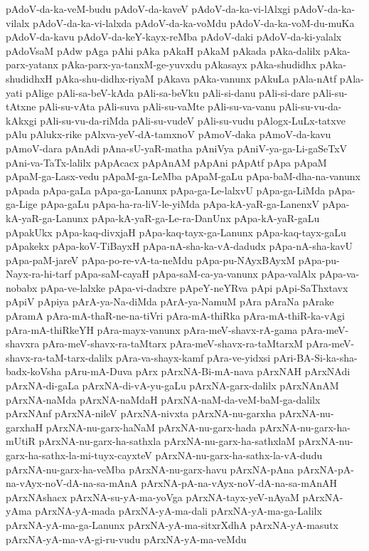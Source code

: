 {pAdoV-da-ka-veM-budu
pAdoV-da-kaveV
pAdoV-da-ka-vi-lAlxgi
pAdoV-da-ka-vilalx
pAdoV-da-ka-vi-lalxda
pAdoV-da-ka-voMdu
pAdoV-da-ka-voM-du-muKa
pAdoV-da-kavu
pAdoV-da-keY-kayx-reMba
pAdoV-daki
pAdoV-da-ki-yalalx
pAdoVsaM
pAdw
pAga
pAhi
pAka
pAkaH
pAkaM
pAkada
pAka-dalilx
pAka-parx-yatanx
pAka-parx-ya-tanxM-ge-yuvxdu
pAkasayx
pAka-shudidhx
pAka-shudidhxH
pAka-shu-didhx-riyaM
pAkava
pAka-vanunx
pAkuLa
pAla-nAtf
pAla-yati
pAlige
pAli-sa-beV-kAda
pAli-sa-beVku
pAli-si-danu
pAli-si-dare
pAli-su-tAtxne
pAli-su-vAta
pAli-suva
pAli-su-vaMte
pAli-su-va-vanu
pAli-su-vu-da-kAkxgi
pAli-su-vu-da-riMda
pAli-su-vudeV
pAli-su-vudu
pAlogx-LuLx-tatxve
pAlu
pAlukx-rike
pAlxva-yeV-dA-tamxnoV
pAmoV-daka
pAmoV-da-kavu
pAmoV-dara
pAnAdi
pAna-sU-yaR-matha
pAniVya
pAniV-ya-ga-Li-gaSeTxV
pAni-va-TaTx-lalilx
pApAcacx
pApAnAM
pApAni
pApAtf
pApa
pApaM
pApaM-ga-Lasx-vedu
pApaM-ga-LeMba
pApaM-gaLu
pApa-baM-dha-na-vanunx
pApada
pApa-gaLa
pApa-ga-Lanunx
pApa-ga-Le-lalxvU
pApa-ga-LiMda
pApa-ga-Lige
pApa-gaLu
pApa-ha-ra-liV-le-yiMda
pApa-kA-yaR-ga-LanenxV
pApa-kA-yaR-ga-Lanunx
pApa-kA-yaR-ga-Le-ra-DanUnx
pApa-kA-yaR-gaLu
pApakUkx
pApa-kaq-divxjaH
pApa-kaq-tayx-ga-Lanunx
pApa-kaq-tayx-gaLu
pApakekx
pApa-koV-TiBayxH
pApa-nA-sha-ka-vA-dadudx
pApa-nA-sha-kavU
pApa-paM-jareV
pApa-po-re-vA-ta-neMdu
pApa-pu-NAyxBAyxM
pApa-pu-Nayx-ra-hi-tarf
pApa-saM-cayaH
pApa-saM-ca-ya-vanunx
pApa-valAlx
pApa-va-nobabx
pApa-ve-lalxke
pApa-vi-dadxre
pApeY-neYRva
pApi
pApi-SaThxtavx
pApiV
pApiya
pArA-ya-Na-diMda
pArA-ya-NamuM
pAra
pAraNa
pArake
pAramA
pAra-mA-thaR-ne-na-tiVri
pAra-mA-thiRka
pAra-mA-thiR-ka-vAgi
pAra-mA-thiRkeYH
pAra-mayx-vanunx
pAra-meV-shavx-rA-gama
pAra-meV-shavxra
pAra-meV-shavx-ra-taMtarx
pAra-meV-shavx-ra-taMtarxM
pAra-meV-shavx-ra-taM-tarx-dalilx
pAra-va-shayx-kamf
pAra-ve-yidxsi
pAri-BA-Si-ka-sha-badx-koVsha
pAru-mA-Duva
pArx
pArxNA-Bi-mA-nava
pArxNAH
pArxNAdi
pArxNA-di-gaLa
pArxNA-di-vA-yu-gaLu
pArxNA-garx-dalilx
pArxNAnAM
pArxNA-naMda
pArxNA-naMdaH
pArxNA-naM-da-veM-baM-ga-dalilx
pArxNAnf
pArxNA-nileV
pArxNA-nivxta
pArxNA-nu-garxha
pArxNA-nu-garxhaH
pArxNA-nu-garx-haNaM
pArxNA-nu-garx-hada
pArxNA-nu-garx-ha-mUtiR
pArxNA-nu-garx-ha-sathxla
pArxNA-nu-garx-ha-sathxlaM
pArxNA-nu-garx-ha-sathx-la-mi-tuyx-cayxteV
pArxNA-nu-garx-ha-sathx-la-vA-dudu
pArxNA-nu-garx-ha-veMba
pArxNA-nu-garx-havu
pArxNA-pAna
pArxNA-pA-na-vAyx-noV-dA-na-sa-mAnA
pArxNA-pA-na-vAyx-noV-dA-na-sa-mAnAH
pArxNAshacx
pArxNA-su-yA-ma-yoVga
pArxNA-tayx-yeV-nAyaM
pArxNA-yAma
pArxNA-yA-mada
pArxNA-yA-ma-dali
pArxNA-yA-ma-ga-Lalilx
pArxNA-yA-ma-ga-Lanunx
pArxNA-yA-ma-sitxrXdhA
pArxNA-yA-masutx
pArxNA-yA-ma-vA-gi-ru-vudu
pArxNA-yA-ma-veMdu
}
